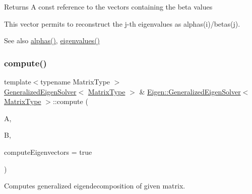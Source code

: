\begin{DoxyReturn}{Returns}
A const reference to the vectors containing the beta values
\end{DoxyReturn}
This vector permits to reconstruct the j-\/th eigenvalues as alphas(i)/betas(j).

\begin{DoxySeeAlso}{See also}
\mbox{\hyperlink{class_eigen_1_1_generalized_eigen_solver_a82b1bc41267f46e5c5899d5b084a73bb}{alphas()}}, \mbox{\hyperlink{class_eigen_1_1_generalized_eigen_solver_a62f01cd78271efd5e39bcb24e0fe1a58}{eigenvalues()}} 
\end{DoxySeeAlso}
\mbox{\label{class_eigen_1_1_generalized_eigen_solver_a275910b47dfe5f40211dcb59cfd68f3c}} 
\subsubsection{\texorpdfstring{compute()}{compute()}}
{\footnotesize\ttfamily template$<$typename Matrix\+Type $>$ \\
\mbox{\hyperlink{class_eigen_1_1_generalized_eigen_solver}{Generalized\+Eigen\+Solver}}$<$ \mbox{\hyperlink{class_eigen_1_1_generalized_eigen_solver_a56f4b9823bb9a267de3aaf48428cd247}{Matrix\+Type}} $>$ \& \mbox{\hyperlink{class_eigen_1_1_generalized_eigen_solver}{Eigen\+::\+Generalized\+Eigen\+Solver}}$<$ \mbox{\hyperlink{class_eigen_1_1_generalized_eigen_solver_a56f4b9823bb9a267de3aaf48428cd247}{Matrix\+Type}} $>$\+::compute (\begin{DoxyParamCaption}\item[{const \mbox{\hyperlink{class_eigen_1_1_generalized_eigen_solver_a56f4b9823bb9a267de3aaf48428cd247}{Matrix\+Type}} \&}]{A,  }\item[{const \mbox{\hyperlink{class_eigen_1_1_generalized_eigen_solver_a56f4b9823bb9a267de3aaf48428cd247}{Matrix\+Type}} \&}]{B,  }\item[{bool}]{compute\+Eigenvectors = {\ttfamily true} }\end{DoxyParamCaption})}



Computes generalized eigendecomposition of given matrix. 


